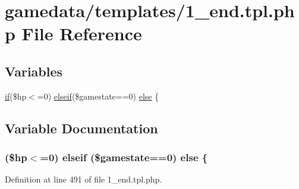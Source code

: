 \hypertarget{1__end_8tpl_8php}{\section{gamedata/templates/1\+\_\+end.tpl.\+php File Reference}
\label{1__end_8tpl_8php}
}
\subsection*{Variables}
\begin{DoxyCompactItemize}
\item 
\hyperlink{login__old_8php_a4ac1118c2e44c513a674bc1793ba6c90}{if}(\$hp$<$=0) \hyperlink{urlist_8php_a77f52b43f81ed05a41b68c2161789055}{elseif}(\$gamestate==0) \hyperlink{1__end_8tpl_8php_a40313ff09f904767e920a67eb825abbc}{else} \{
\end{DoxyCompactItemize}


\subsection{Variable Documentation}
\hypertarget{1__end_8tpl_8php_a40313ff09f904767e920a67eb825abbc}{
\subsubsection[{else}]{ (\$hp$<$=0) {\bf elseif} (\$gamestate==0) else \{}}\label{1__end_8tpl_8php_a40313ff09f904767e920a67eb825abbc}


Definition at line 491 of file 1\+\_\+end.\+tpl.\+php.

